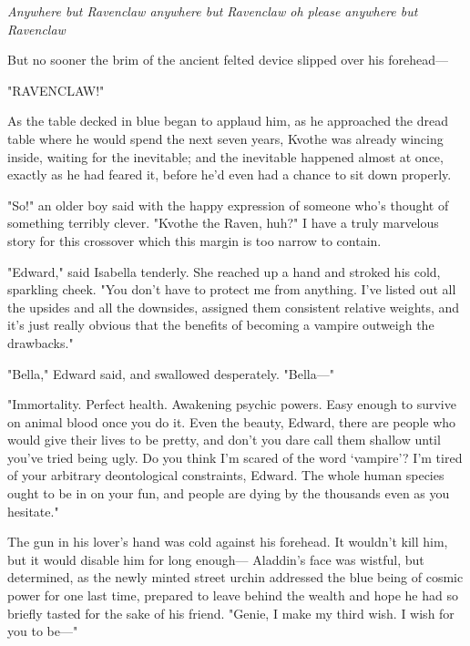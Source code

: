 \emph{Anywhere but Ravenclaw anywhere but Ravenclaw oh please anywhere but
Ravenclaw{\el}}

But no sooner the brim of the ancient felted device slipped over his forehead---

"RAVENCLAW!"

As the table decked in blue began to applaud him, as he approached the dread
table where he would spend the next seven years, Kvothe was already wincing
inside, waiting for the inevitable; and the inevitable happened almost at once,
exactly as he had feared it, before he'd even had a chance to sit down properly.

"So!" an older boy said with the happy expression of someone who's thought of
something terribly clever. "Kvothe the Raven, huh?"
\sbreak
\newpage
{}
I have a truly marvelous story for this crossover which this margin is too
narrow to contain.
\sbreak
%

\noindent{}"Edward," said Isabella tenderly. She reached up a hand and stroked his cold,
sparkling cheek. "You don't have to protect me from anything. I've listed out
all the upsides and all the downsides, assigned them consistent relative
weights, and it's just really obvious that the benefits of becoming a vampire
outweigh the drawbacks."

"Bella," Edward said, and swallowed desperately. "Bella\mbox{---}"

"Immortality. Perfect health. Awakening psychic powers. Easy enough to survive
on animal blood once you do it. Even the beauty, Edward, there are people who
would give their lives to be pretty, and don't you dare call them shallow until
you've tried being ugly. Do you think I'm scared of the word `vampire'? I'm
tired of your arbitrary deontological constraints, Edward. The whole human
species ought to be in on your fun, and people are dying by the thousands even
as you hesitate."

The gun in his lover's hand was cold against his forehead. It wouldn't kill
him, but it would disable him for long enough---
\sbreak
Aladdin's face was wistful, but determined, as the newly minted street urchin
addressed the blue being of cosmic power for one last time, prepared to leave
behind the wealth and hope he had so briefly tasted for the sake of his friend.
"Genie, I make my third wish. I wish for you to be\mbox{---}"

